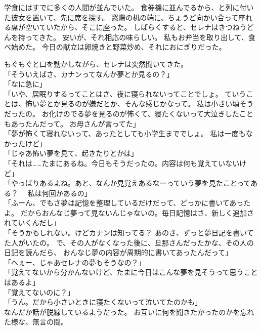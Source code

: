 \documentclass[../IHMain]{subfiles}
\begin{document}
学食にはすでに多くの人間が並んでいた。
食券機に並んでるから、と列に付いた彼女を置いて、先に席を探す。
窓際の机の端に、ちょうど向かい合って座れる席が空いていたから、そこに座った。
しばらくすると、セレナはきつねうどんを持ってきた。
安いが、それ相応の味らしい。
私もお弁当を取り出して、食べ始めた。
今日の献立は卵焼きと野菜炒め、それにおにぎりだった。

もぐもぐと口を動かしながら、セレナは突然聞いてきた。\\
「そういえばさ、カナンってなんか夢とか見るの？」\\
「なに急に」\\
「いや、居眠りするってことはさ、夜に寝られないってことでしょ。
ていうことは、怖い夢とか見るのが嫌だとか、そんな感じかなって。
私は小さい頃そうだったの。
お化けのでる夢を見るのが怖くて、寝たくないって大泣きしたこともあったんだって。
お母さんが言ってた」\\
「夢が怖くて寝れないって、あったとしても小学生まででしょ。
私は一度もなかったけど」\\
「じゃあ怖い夢を見て、起きたりとかは」\\
「それは……たまにあるね。今日もそうだったの。内容は何も覚えていないけど」\\
「やっぱりあるよね。あと、なんか見覚えあるなーっていう夢を見たことってある？　
私は何回かあるの」\\
「ふーん、でもさ夢は記憶を整理しているだけだって、どっかに書いてあったよ。
だからおんなじ夢って見ないんじゃないの。毎日記憶はさ、新しく追加されていくんだし」\\
「そうかもしれない。けどカナンは知ってる？
あのさ、ずっと夢日記を書いてた人がいたの。
で、その人がなくなった後に、旦那さんだったかな、その人の日記を読んだら、
おんなじ夢の内容が周期的に書いてあったんだって」\\
「へぇー、じゃあセレナの夢もそうなの？」\\
「覚えてないから分かんないけど、たまに今日はこんな夢を見そうって思うことはあるよ」\\
「覚えてないのに？」\\
「うん。だから小さいときに寝たくないって泣いてたのかも」\\
なんだか話が脱線しているようだった。
お互いに何を聞きたかったのかを忘れた様な、無言の間。
\end{document}
